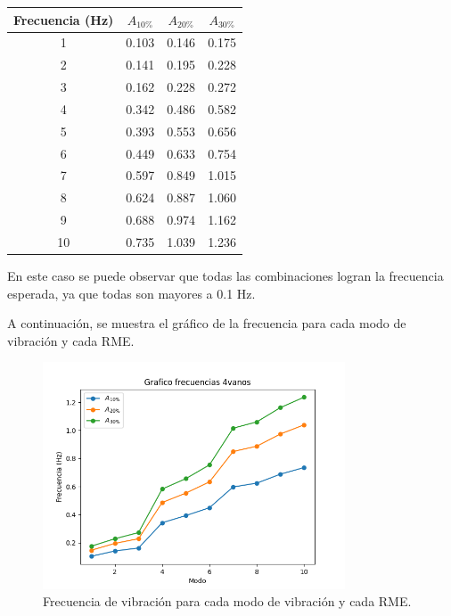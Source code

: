 \begin{table}[H]
    \centering
    \begin{tabular}{cccc}
    \toprule
     Frecuencia (Hz) & $A_{10\%}$ & $A_{20\%}$ & $A_{30\%}$ \\
    \midrule
     1 &       0.103 &       0.146 &       0.175 \\
     2 &       0.141 &       0.195 &       0.228 \\
     3 &       0.162 &       0.228 &       0.272 \\
     4 &       0.342 &       0.486 &       0.582 \\
     5 &       0.393 &       0.553 &       0.656 \\
     6 &       0.449 &       0.633 &       0.754 \\
     7 &       0.597 &       0.849 &       1.015 \\
     8 &       0.624 &       0.887 &       1.060 \\
     9 &       0.688 &       0.974 &       1.162 \\
     10 &       0.735 &       1.039 &       1.236 \\
    \bottomrule
    \end{tabular}
\end{table}

En este caso se puede observar que todas las combinaciones logran la frecuencia esperada, ya que todas son mayores a 0.1 Hz.

A continuación, se muestra el gráfico de la frecuencia para cada modo de vibración y cada RME. 

\begin{figure}[H]
    \centering
    \includegraphics[width=0.8\textwidth]{../grafico_frecuencias_4vanos.png}
    \caption{Frecuencia de vibración para cada modo de vibración y cada RME.}
\end{figure}

